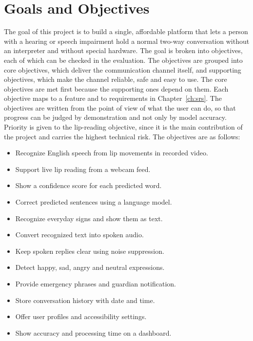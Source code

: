 \documentclass{FastFyp}
\begin{document}
\section{Goals and Objectives}
The goal of this project is to build a single, affordable platform that lets a person with a hearing or speech impairment hold a normal two-way conversation without an interpreter and without special hardware. The goal is broken into objectives, each of which can be checked in the evaluation. The objectives are grouped into core objectives, which deliver the communication channel itself, and supporting objectives, which make the channel reliable, safe and easy to use. The core objectives are met first because the supporting ones depend on them. Each objective maps to a feature and to requirements in Chapter~\ref{ch:srs}. The objectives are written from the point of view of what the user can do, so that progress can be judged by demonstration and not only by model accuracy. Priority is given to the lip-reading objective, since it is the main contribution of the project and carries the highest technical risk. The objectives are as follows:
\begin{itemize}
  \item Recognize English speech from lip movements in recorded video.
  \item Support live lip reading from a webcam feed.
  \item Show a confidence score for each predicted word.
  \item Correct predicted sentences using a language model.
  \item Recognize everyday signs and show them as text.
  \item Convert recognized text into spoken audio.
  \item Keep spoken replies clear using noise suppression.
  \item Detect happy, sad, angry and neutral expressions.
  \item Provide emergency phrases and guardian notification.
  \item Store conversation history with date and time.
  \item Offer user profiles and accessibility settings.
  \item Show accuracy and processing time on a dashboard.
\end{itemize}
\end{document}
